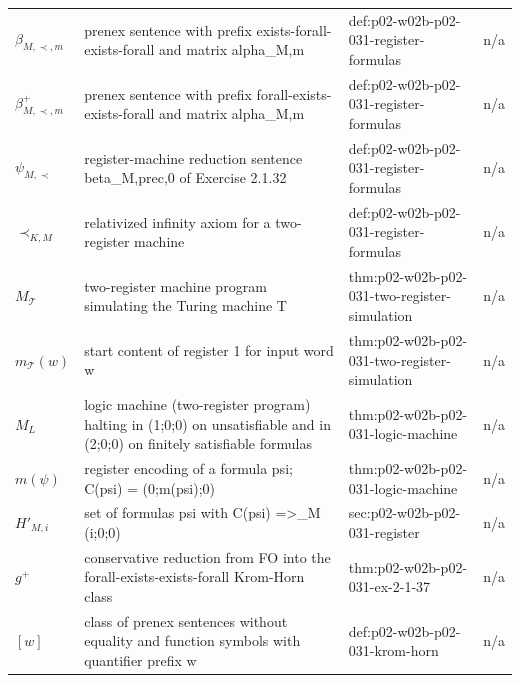 \begin{longtable}{@{}p{}p{}p{}p{}@{}}
\(\beta_{M,\prec,m}\) & prenex sentence with prefix exists-forall-exists-forall and matrix alpha\_{M,m} & def:\allowbreak{}p02-\allowbreak{}w02b-\allowbreak{}p02-\allowbreak{}031-\allowbreak{}register-\allowbreak{}formulas & n/a \\
\(\beta^{+}_{M,\prec,m}\) & prenex sentence with prefix forall-exists-exists-forall and matrix alpha\_{M,m} & def:\allowbreak{}p02-\allowbreak{}w02b-\allowbreak{}p02-\allowbreak{}031-\allowbreak{}register-\allowbreak{}formulas & n/a \\
\(\psi_{M,\prec}\) & register-machine reduction sentence beta\_{M,prec,0} of Exercise 2.1.32 & def:\allowbreak{}p02-\allowbreak{}w02b-\allowbreak{}p02-\allowbreak{}031-\allowbreak{}register-\allowbreak{}formulas & n/a \\
\(\prec_{K,M}\) & relativized infinity axiom for a two-register machine & def:\allowbreak{}p02-\allowbreak{}w02b-\allowbreak{}p02-\allowbreak{}031-\allowbreak{}register-\allowbreak{}formulas & n/a \\
\(M_{\mathcal T}\) & two-register machine program simulating the Turing machine T & thm:\allowbreak{}p02-\allowbreak{}w02b-\allowbreak{}p02-\allowbreak{}031-\allowbreak{}two-\allowbreak{}register-\allowbreak{}simulation & n/a \\
\(m_{\mathcal T}(w)\) & start content of register 1 for input word w & thm:\allowbreak{}p02-\allowbreak{}w02b-\allowbreak{}p02-\allowbreak{}031-\allowbreak{}two-\allowbreak{}register-\allowbreak{}simulation & n/a \\
\(M_L\) & logic machine (two-register program) halting in (1;0;0) on unsatisfiable and in (2;0;0) on finitely satisfiable formulas & thm:\allowbreak{}p02-\allowbreak{}w02b-\allowbreak{}p02-\allowbreak{}031-\allowbreak{}logic-\allowbreak{}machine & n/a \\
\(m(\psi)\) & register encoding of a formula psi; C(psi) = (0;m(psi);0) & thm:\allowbreak{}p02-\allowbreak{}w02b-\allowbreak{}p02-\allowbreak{}031-\allowbreak{}logic-\allowbreak{}machine & n/a \\
\(H'_{M,i}\) & set of formulas psi with C(psi) =>\_M (i;0;0) & sec:\allowbreak{}p02-\allowbreak{}w02b-\allowbreak{}p02-\allowbreak{}031-\allowbreak{}register & n/a \\
\(g^{+}\) & conservative reduction from FO into the forall-exists-exists-forall Krom-Horn class & thm:\allowbreak{}p02-\allowbreak{}w02b-\allowbreak{}p02-\allowbreak{}031-\allowbreak{}ex-\allowbreak{}2-\allowbreak{}1-\allowbreak{}37 & n/a \\
\([w]\) & class of prenex sentences without equality and function symbols with quantifier prefix w & def:\allowbreak{}p02-\allowbreak{}w02b-\allowbreak{}p02-\allowbreak{}031-\allowbreak{}krom-\allowbreak{}horn & n/a \\

\end{longtable}
